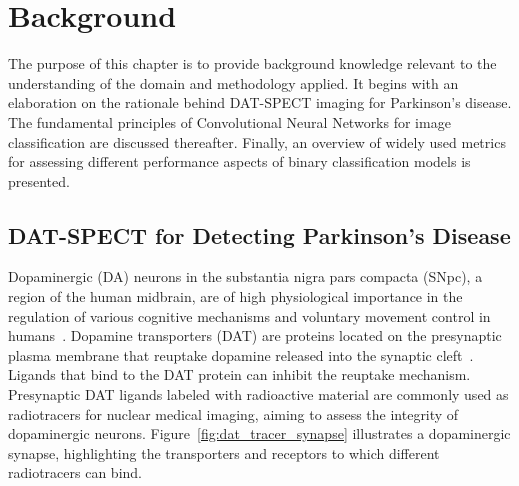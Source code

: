 \section{Background}
\label{sec:background}

The purpose of this chapter is to provide background knowledge relevant to the understanding of
the domain and methodology applied.
It begins with an elaboration on the rationale behind DAT-SPECT imaging for Parkinson's disease.
The fundamental principles of Convolutional Neural Networks for image classification are discussed thereafter. 
Finally, an overview of widely used metrics for assessing different performance aspects
of binary classification models is presented.

\subsection{DAT-SPECT for Detecting Parkinson's Disease}
\label{subsec:datspect}


Dopaminergic (DA) neurons in the substantia nigra pars compacta (SNpc), a region of the human midbrain, 
are of high physiological importance in the regulation of various cognitive mechanisms 
and voluntary movement control in humans~\citep{Luo2016-zj}.
Dopamine transporters (DAT) are proteins located on the presynaptic plasma membrane 
that reuptake dopamine released into the synaptic cleft~\citep{Giros1993-xb}.
Ligands that bind to the DAT protein can inhibit the reuptake mechanism.
Presynaptic DAT ligands labeled with radioactive material are commonly used as radiotracers for nuclear medical imaging,
aiming to assess the integrity of dopaminergic neurons.
Figure~\ref{fig:dat_tracer_synapse} illustrates a dopaminergic synapse, 
highlighting the transporters and receptors to which different radiotracers can bind.

